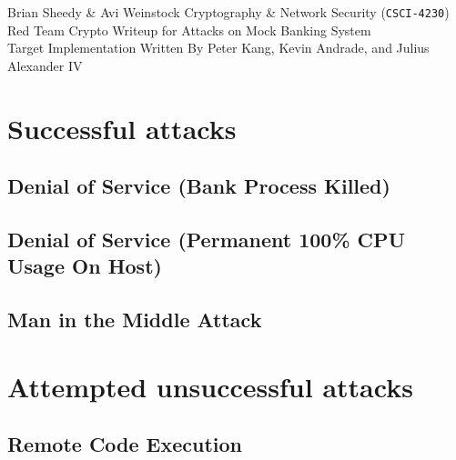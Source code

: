 \documentclass[12pt]{article}
\begin{document}
\noindent
Brian Sheedy \& Avi Weinstock \hfill Cryptography \& Network Security (\Verb|CSCI-4230|)\\
Red Team Crypto Writeup for Attacks on Mock Banking System\\
Target Implementation Written By Peter Kang, Kevin Andrade, and Julius Alexander IV
\doublespace

\section*{Successful attacks}
\subsection*{Denial of Service (Bank Process Killed)}
\subsection*{Denial of Service (Permanent 100\% CPU Usage On Host)}
\subsection*{Man in the Middle Attack}
\section*{Attempted unsuccessful attacks}
\subsection*{Remote Code Execution}
\end{document}
